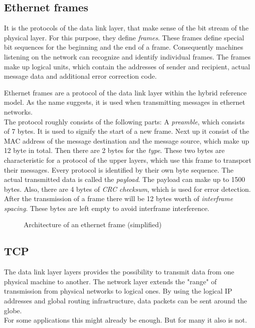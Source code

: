 \subsection{Ethernet frames}
\label{sec:eth}

It is the protocols of the data link layer, that make sense of the bit stream of the physical layer. For this purpose, they define \textit{frames}. These frames define special bit sequences for the beginning and the end of a frame. Consequently machines listening on the network can recognize and identify individual frames. The frames make up logical units, which contain the addresses of sender and recipient, actual message data and additional error correction code.\par 

Ethernet frames are a protocol of the data link layer within the hybrid reference model. As the name suggests, it is used when transmitting messages in ethernet networks.\\
The protocol roughly consists of the following parts: A \textit{preamble}, which consists of 7 bytes. It is used to signify the start of a new frame. Next up it consist of the MAC address of the message destination and the message source, which make up 12 byte in total. Then there are 2 bytes for the \textit{type}. These two bytes are characteristic for a protocol of the upper layers, which use this frame to transport their messages. Every protocol is identified by their own byte sequence. The actual transmitted data is called the \textit{payload}. The payload can make up to 1500 bytes. Also, there are 4 bytes of \textit{CRC checksum}, which is used for error detection.\\
After the transmission of a frame there will be 12 bytes worth of \textit{interframe spacing}. These bytes are left empty to avoid interframe interference.\cite{ComputerNetworks}

\setlength{\fboxsep}{0pt}%
\setlength{\fboxrule}{0pt}%
\begin{figure}[h]
\centering
{}
\caption[Architecture of an ethernet frame]{Architecture of an ethernet frame (simplified)}
\end{figure}

\subsection{TCP}
\label{sec:tcp}

The data link layer layers provides the possibility to transmit data from one physical machine to another. The network layer extends the "range" of transmission from physical networks to logical ones. By using the logical IP addresses and global routing infrastructure, data packets can be sent around the globe.\\
For some applications this might already be enough. But for many it also is not.\par 

